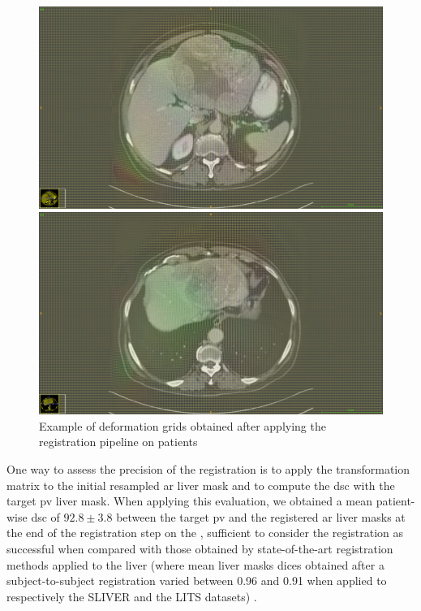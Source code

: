 \begin{figure}
\centering
\begin{minipage}{0.7\linewidth}
\includegraphics[width=\linewidth]{../HistologicalGradePrediction/images/ResizeTCIA_TCGA-DD-A11A_deformation_grid_slice49}
\end{minipage}

\vspace{0.8cm}
\begin{minipage}{0.7\linewidth}
\includegraphics[width=\linewidth]{../HistologicalGradePrediction/images/ResizeTCIA_TCGA-DD-A11A_deformation_grid_slice68}
\end{minipage}
\caption{Example of deformation grids obtained after applying the registration pipeline on  patients}
\label{fig:deformationGridExamples}
\end{figure}
One way to assess the precision of the registration is to apply the
transformation matrix to the initial resampled \ac{ar} liver mask and to
compute the \ac{dsc} with the target \ac{pv} liver mask. When applying this
evaluation, we obtained a mean patient-wise \ac{dsc} of $ 92.8 \pm 3.8 $ between the target \ac{pv} and the registered \ac{ar} liver masks at the
end of the registration step on the \textbf{}, sufficient to consider the
registration as successful when compared with those obtained by state-of-the-art
registration methods applied to the liver (where mean liver masks dices obtained after a subject-to-subject registration varied between 0.96 and 0.91 when applied to respectively the SLIVER and the LITS datasets) \cite{Zhao2019}.

